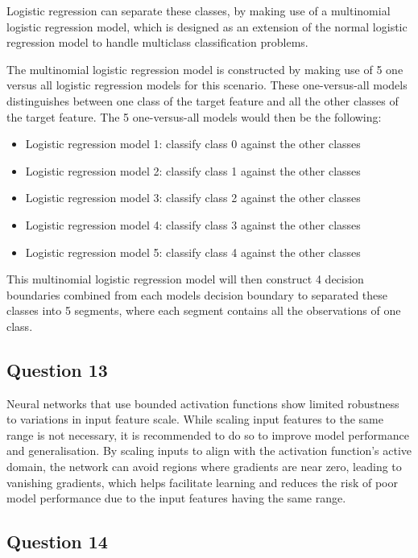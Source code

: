 \documentclass[10pt]{article}
\begin{document}
Logistic regression can separate these classes, by making use of a multinomial logistic regression model, which
is designed as an extension of the normal logistic regression model to handle multiclass classification problems.

The multinomial logistic regression model is constructed by making use of 5 one versus all logistic regression models
for this scenario. These one-versus-all models distinguishes between one class of the target feature and all the other
classes of the target feature. The 5 one-versus-all models would then be the following:
\begin{itemize}
    \item Logistic regression model 1: classify class 0 against the other classes
    \item Logistic regression model 2: classify class 1 against the other classes
    \item Logistic regression model 3: classify class 2 against the other classes
    \item Logistic regression model 4: classify class 3 against the other classes
    \item Logistic regression model 5: classify class 4 against the other classes
\end{itemize}
This multinomial logistic regression model will then construct 4 decision boundaries combined from each
models decision boundary to separated these classes into 5 segments, where each segment contains all the
observations of one class.

\subsection*{Question 13}

Neural networks that use bounded activation functions show limited robustness to variations in input feature scale.
While scaling input features to the same range is not necessary, it is recommended to do so to improve model
performance and generalisation. By scaling inputs to align with the activation function's active domain, the
network can avoid regions where gradients are near zero, leading to vanishing gradients, which helps facilitate
learning and reduces the risk of poor model performance due to the input features having the same range.

\subsection*{Question 14}
\end{document}
